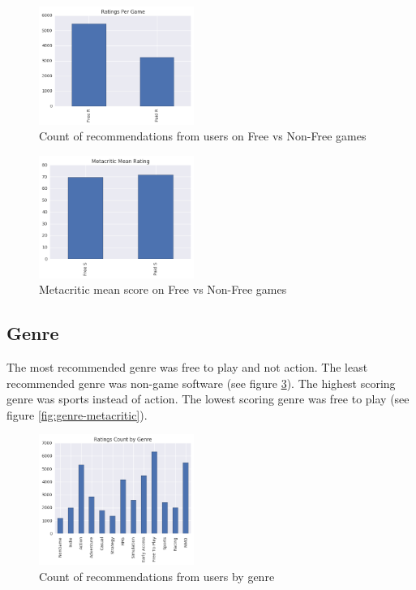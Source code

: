 \documentclass[letterpaper,10pt,twocolumn]{article}
\begin{document}
\begin{figure}[H]
    \label{fig:freevnon-ratings}
    \caption{Count of recommendations from users on Free vs Non-Free games}
    \includegraphics[width=0.45\textwidth,keepaspectratio]{freevnon-ratings-bar}
\end{figure}

\begin{figure}[H]
    \label{fig:freevnon-metacritic}
    \caption{Metacritic mean score on Free vs Non-Free games}
    \includegraphics[width=0.45\textwidth,keepaspectratio]{freevnon-metacritic-bar}
\end{figure}


\subsection{Genre}

The most recommended genre was free to play and not action. The least
recommended genre was non-game software (see figure \ref{fig:genre-ratings}).
The highest scoring genre was sports instead of action. The lowest
scoring genre was free to play (see figure \ref{fig:genre-metacritic}).

\begin{figure}[H]
    \label{fig:genre-ratings}
    \caption{Count of recommendations from users by genre}
    \includegraphics[width=0.45\textwidth,keepaspectratio]{genre-ratings-bar}
\end{figure}
\end{document}

